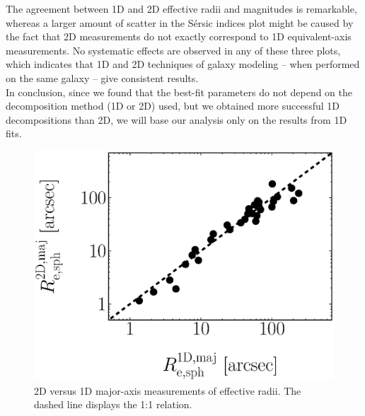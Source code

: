 \documentclass[preprint2]{emulateapj}
\begin{document}
The agreement between 1D and 2D effective radii and magnitudes is remarkable, 
whereas a larger amount of scatter in the S\'ersic indices plot might be caused by the fact that 
2D measurements do not exactly correspond to 1D equivalent-axis measurements. 
No systematic effects are observed in any of these three plots, 
which indicates that 1D and 2D techniques of galaxy modeling -- when performed on the same galaxy -- 
give consistent results. \\
In conclusion, since we found that the best-fit parameters do not depend on the decomposition method (1D or 2D) used, 
but we obtained more successful 1D decompositions than 2D, 
we will base our analysis only on the results from 1D fits.


\begin{figure}[h]
\begin{center}
\includegraphics[width=\columnwidth]{images/comparison_r_e.eps} 
\caption{2D versus 1D major-axis measurements of effective radii. 
The dashed line displays the 1:1 relation.}
\label{fig:re1d2d}
\end{center}
\end{figure}
\end{document}
